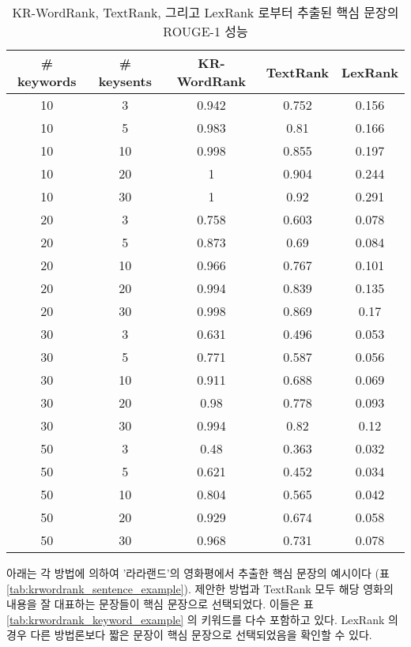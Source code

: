 \documentclass[oneside, ko,phd]{snuthesis_utf8_kor}
\begin{document}
\begin{table}[H]
\centering
\small
\caption{KR-WordRank, TextRank, 그리고 LexRank 로부터 추출된 핵심 문장의 ROUGE-1 성능}
\label{tab:krwordrank_sentence_performance}
\begin{tabular}{|c|c|c|c|c|}
\hline
\textbf{\# keywords} & \textbf{\# keysents} & \textbf{KR-WordRank} & \textbf{TextRank} & \textbf{LexRank} \\ \hline
10 & 3 & 0.942 & 0.752 & 0.156 \\ \hline
10 & 5 & 0.983 & 0.81 & 0.166 \\ \hline
10 & 10 & 0.998 & 0.855 & 0.197 \\ \hline
10 & 20 & 1 & 0.904 & 0.244 \\ \hline
10 & 30 & 1 & 0.92 & 0.291 \\ \hline
20 & 3 & 0.758 & 0.603 & 0.078 \\ \hline
20 & 5 & 0.873 & 0.69 & 0.084 \\ \hline
20 & 10 & 0.966 & 0.767 & 0.101 \\ \hline
20 & 20 & 0.994 & 0.839 & 0.135 \\ \hline
20 & 30 & 0.998 & 0.869 & 0.17 \\ \hline
30 & 3 & 0.631 & 0.496 & 0.053 \\ \hline
30 & 5 & 0.771 & 0.587 & 0.056 \\ \hline
30 & 10 & 0.911 & 0.688 & 0.069 \\ \hline
30 & 20 & 0.98 & 0.778 & 0.093 \\ \hline
30 & 30 & 0.994 & 0.82 & 0.12 \\ \hline
50 & 3 & 0.48 & 0.363 & 0.032 \\ \hline
50 & 5 & 0.621 & 0.452 & 0.034 \\ \hline
50 & 10 & 0.804 & 0.565 & 0.042 \\ \hline
50 & 20 & 0.929 & 0.674 & 0.058 \\ \hline
50 & 30 & 0.968 & 0.731 & 0.078 \\ \hline
\end{tabular}
\end{table}

아래는 각 방법에 의하여 '라라랜드'의 영화평에서 추출한 핵심 문장의 예시이다 (표 \ref{tab:krwordrank_sentence_example}).
제안한 방법과 TextRank 모두 해당 영화의 내용을 잘 대표하는 문장들이 핵심 문장으로 선택되었다.
이들은 표 \ref{tab:krwordrank_keyword_example} 의 키워드를 다수 포함하고 있다.
LexRank 의 경우 다른 방법론보다 짧은 문장이 핵심 문장으로 선택되었음을 확인할 수 있다.
\end{document}
